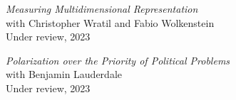 \documentclass[centered]{res}
\begin{document}
\begin{resume}
{\sl Measuring Multidimensional Representation} \\
with Christopher Wratil and Fabio Wolkenstein \\
Under review, 2023

{\sl Polarization over the Priority of Political Problems} \\
with Benjamin Lauderdale \\
Under review, 2023






\end{resume}
\end{document}
